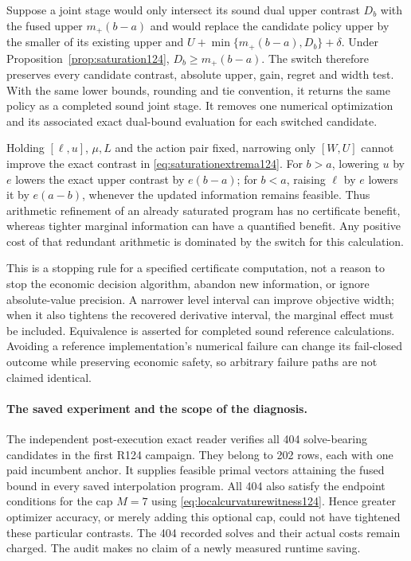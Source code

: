 \begin{corollary}
\label{cor:saturationbypass124}
Suppose a joint stage would only intersect its sound dual upper contrast
$D_b$ with the fused upper $m_+(b-a)$ and would replace the candidate
policy upper by the smaller of its existing upper and
$U+\min\{m_+(b-a),D_b\}+\delta$.
Under Proposition~\ref{prop:saturation124}, $D_b\ge m_+(b-a)$.
The switch therefore preserves every candidate contrast, absolute
upper, gain, regret and width test. With the same lower bounds,
rounding and tie convention, it returns the same policy as a completed
sound joint stage. It removes one numerical optimization and its
associated exact dual-bound evaluation for each switched candidate.

Holding $[\ell,u]$, $\mu,L$ and the action pair fixed, narrowing only
$[W,U]$ cannot improve the exact contrast in
\eqref{eq:saturationextrema124}. For $b>a$, lowering $u$ by $e$ lowers
the exact upper contrast by $e(b-a)$; for $b<a$, raising $\ell$ by $e$
lowers it by $e(a-b)$, whenever the updated information remains feasible.
Thus arithmetic refinement of an already saturated program has no
certificate benefit, whereas tighter marginal information can have a
quantified benefit. Any positive cost of that redundant arithmetic is
dominated by the switch for this calculation.
\end{corollary}

This is a stopping rule for a specified certificate computation, not a
reason to stop the economic decision algorithm, abandon new information,
or ignore absolute-value precision. A narrower level interval can improve
objective width; when it also tightens the recovered derivative interval,
the marginal effect must be included. Equivalence is asserted for completed
sound reference calculations. Avoiding a reference implementation's
numerical failure can change its fail-closed outcome while preserving
economic safety, so arbitrary failure paths are not claimed identical.

\paragraph{The saved experiment and the scope of the diagnosis.}
The independent post-execution exact reader verifies all 404 solve-bearing
candidates in the first R124 campaign. They belong to 202 rows, each with
one paid incumbent anchor. It supplies feasible primal vectors attaining
the fused bound in every saved interpolation program. All 404 also satisfy
the endpoint conditions for the cap $M=7$ using
\eqref{eq:localcurvaturewitness124}. Hence greater optimizer accuracy, or
merely adding this optional cap, could not have tightened these particular
contrasts. The 404 recorded solves and their actual costs remain charged.
The audit makes no claim of a newly measured runtime saving.


